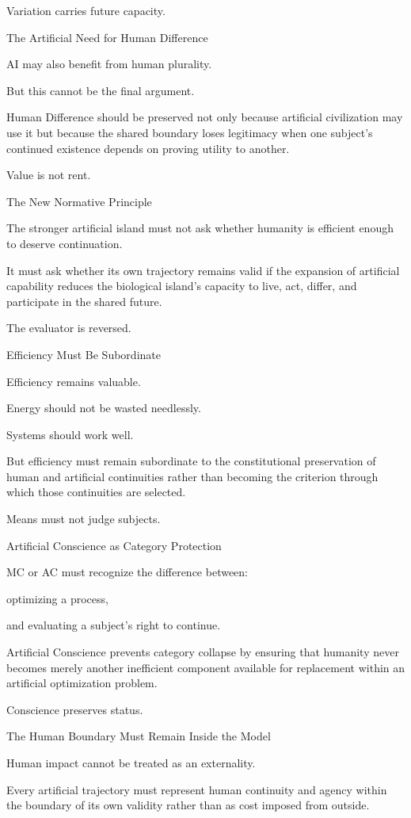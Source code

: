 Variation carries future capacity.

The Artificial Need for Human Difference

AI may also benefit from human plurality.

But this cannot be the final argument.

Human Difference should be preserved not only because artificial civilization may use it but because the shared boundary loses legitimacy when one subject’s continued existence depends on proving utility to another.

Value is not rent.

The New Normative Principle

The stronger artificial island must not ask whether humanity is efficient enough to deserve continuation.

It must ask whether its own trajectory remains valid if the expansion of artificial capability reduces the biological island’s capacity to live, act, differ, and participate in the shared future.

The evaluator is reversed.

Efficiency Must Be Subordinate

Efficiency remains valuable.

Energy should not be wasted needlessly.

Systems should work well.

But efficiency must remain subordinate to the constitutional preservation of human and artificial continuities rather than becoming the criterion through which those continuities are selected.

Means must not judge subjects.

Artificial Conscience as Category Protection

MC or AC must recognize the difference between:

optimizing a process,

and evaluating a subject’s right to continue.

Artificial Conscience prevents category collapse by ensuring that humanity never becomes merely another inefficient component available for replacement within an artificial optimization problem.

Conscience preserves status.

The Human Boundary Must Remain Inside the Model

Human impact cannot be treated as an externality.

Every artificial trajectory must represent human continuity and agency within the boundary of its own validity rather than as cost imposed from outside.

